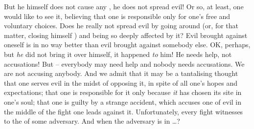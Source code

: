 But he himself does not cause any , he does not spread evil! Or
so, at least, one would like to see it, believing that one is responsible
only for one's free and voluntary choices. Does he really not spread evil by
going around (or, for that matter, closing himself ) and being so
deeply affected by it?
%
Evil brought against oneself is in no way better than evil brought against
somebody else.  OK, perhaps, but {\em he} did not bring it over himself, it
happened {\em to} him! He needs help, not accusations! But -- everybody may need
help and nobody needs accusations. We are not accusing anybody. And we admit
that it may be a tantalising thought that one serves evil in the midst of
opposing it, in spite of all one's hopes and expectations; that one is
responsible for it only because {\em it} has chosen its site in one's soul; that
one is guilty by a strange accident, which accuses one of evil in the middle of
the fight one leads against it. Unfortunately, every fight witnesses to the
 of some adversary. And when the adversary is in \ldots?


